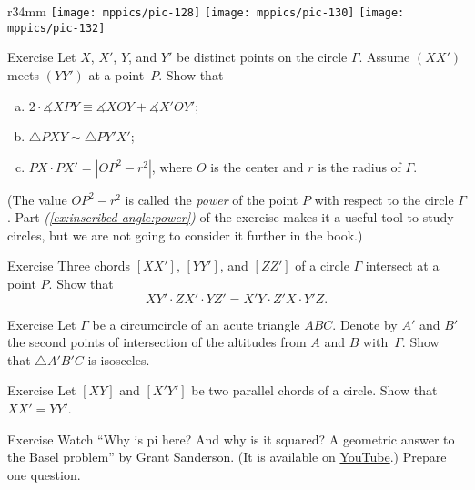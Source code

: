 {

\begin{wrapfigure}{r}{34mm}
\centering
\texttt{[image: mppics/pic-128]}
\vskip3mm
\texttt{[image: mppics/pic-130]}
\vskip3mm
\texttt{[image: mppics/pic-132]}
\end{wrapfigure}

\begin{thm}{Exercise}\label{ex:inscribed-angle}
Let $X$, $X'$, $Y$, and $Y'$ be distinct points on the circle $\Gamma$.
Assume $(XX')$ meets $(YY')$ at a point~$P$.
Show that 
\begin{enumerate}[(a)]
\item $2\cdot \measuredangle XPY\equiv\measuredangle XOY+\measuredangle X'OY'$;
\item\label{ex:inscribed-angle:b} $\triangle PXY\sim \triangle PY'X'$;
\item\label{ex:inscribed-angle:power} $PX\cdot PX'=|OP^2-r^2|$, where $O$ is the center and $r$ is the radius of $\Gamma$.
\end{enumerate}

\end{thm}

(The value $OP^2-r^2$ is called the \emph{power} of the point $P$ with respect to the circle $\Gamma$. 
Part \textit{(\ref{ex:inscribed-angle:power})} of the exercise makes it a useful tool to study circles, but we are not going to consider it further in the book.) 

\begin{thm}{Exercise}\label{ex:inscribed-hex}
Three chords $[XX']$, $[YY']$, and $[ZZ']$
of a circle $\Gamma$ intersect at a point $P$.
Show that 
$$XY'\cdot ZX'\cdot YZ'=X'Y\cdot Z'X\cdot Y'Z.$$

\end{thm}

\begin{thm}{Exercise}\label{ex:altitudes-circumcircle}
Let $\Gamma$ be a circumcircle of an acute triangle $A B C$.
Denote by $A'$ and $B'$ the second points of intersection of the altitudes from $A$ and $B$ with~$\Gamma$.
Show that $\triangle A' B' C$ is isosceles.
\end{thm}

}

\begin{thm}{Exercise}\label{ex:two-chords}
Let $[XY]$ and $[X'Y']$ be two parallel chords of a circle.
Show that $XX'=YY'$.
\end{thm}

\begin{thm}{Exercise}
Watch ``Why is pi here? And why is it squared? A geometric answer to the Basel problem'' by Grant Sanderson. (It is available on \href{https://youtu.be/d-o3eB9sfls}{YouTube}.) 
Prepare one question.
\end{thm}

